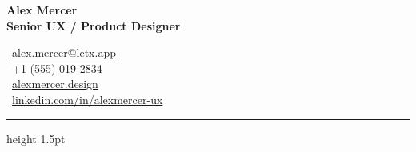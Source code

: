 \documentclass[10pt,letterpaper]{article}
\begin{document}
\pagecolor{pagebg}
\color{darkneutral}

\begin{minipage}[t]{0.55\textwidth}
  \vspace{0pt}
  {\Huge\bfseries\color{accent} Alex Mercer} \\[1.5mm]
  {\large\bfseries\color{muted} Senior UX / Product Designer}
\end{minipage}%
\begin{minipage}[t]{0.45\textwidth}
  \vspace{0pt}
  \raggedleft
  \small
  \faEnvelope\ \href{mailto:alex.mercer@letx.app}{alex.mercer@letx.app} \\[1mm]
  \faPhone\ +1 (555) 019-2834 \\[1mm]
  \faGlobe\ \href{https://alexmercer.design}{alexmercer.design} \\[1mm]
  \faLinkedin\ \href{https://linkedin.com/in/alexmercer-ux}{linkedin.com/in/alexmercer-ux}
\end{minipage}

\vspace{3.5mm}
{\color{accent!30}\hrule height 1.5pt}
\vspace{3.5mm}
\end{document}
